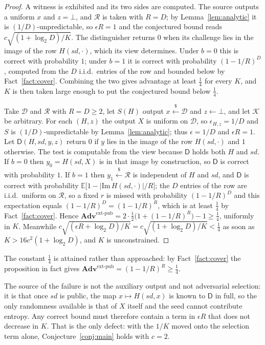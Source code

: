 \documentclass{conjura-solution}
\newcommand{\Adv}{\mathbf{Adv}}
\newcommand{\extp}{\mathrm{ext}\text{-}\mathrm{pub}}
\newcommand{\sd}{\mathit{sd}}
\renewcommand{\sample}{\stackrel{{\scriptscriptstyle\$}}{\leftarrow}}
\newcommand{\calK}{\mathcal{K}}
\newcommand{\calD}{\mathcal{D}}
\newcommand{\calR}{\mathcal{R}}
\begin{document}
\begin{proof}
A witness is exhibited and its two sides are computed. The source outputs a uniform $x$ and
$z = \bot$, and $\calR$ is taken with $R = D$; by Lemma~\ref{lem:analytic} it is
$(1/D)$-unpredictable, so $\epsilon R = 1$ and the conjectured bound reads
$c\sqrt{(1+\log_2 D)/K}$. The distinguisher returns $0$ when its challenge lies in the image of the
row $H(\sd,\cdot)$, which its view determines. Under $b = 0$ this is correct with probability $1$;
under $b = 1$ it is correct with probability $(1-1/R)^{D}$, computed from the $D$ i.i.d.\ entries
of the row and bounded below by Fact~\ref{fact:cover}. Combining the two gives advantage at least $\tfrac14$ for every $K$, and $K$ is then
taken large enough to put the conjectured bound below $\tfrac14$.

Take $\calD$ and $\calR$ with $R = D \ge 2$, let $S(H)$ output $x \sample \calD$ and
$z \leftarrow \bot$, and let $\calK$ be arbitrary. For each $(H,z)$ the output $X$ is uniform on
$\calD$, so $\epsilon_{H,z} = 1/D$ and $S$ is $(1/D)$-unpredictable by
Lemma~\ref{lem:analytic}; thus $\epsilon = 1/D$ and $\epsilon R = 1$. Let $\mathsf{D}(H,\sd,y,z)$
return $0$ if $y$ lies in the image of the row $H(\sd,\cdot)$ and $1$ otherwise. The test is
computable from the view because $\mathsf{D}$ holds both $H$ and $\sd$. If $b = 0$ then
$y_0 = H(\sd,X)$ is in that image by construction, so $\mathsf{D}$ is correct with probability $1$.
If $b = 1$ then $y_1 \sample \calR$ is independent of $H$ and $\sd$, and $\mathsf{D}$ is correct
with probability $\mathbb{E}\bigl[1 - |\mathrm{Im}\,H(\sd,\cdot)|/R\bigr]$; the $D$ entries of the
row are i.i.d.\ uniform on $\calR$, so a fixed $r$ is missed with probability $(1-1/R)^{D}$ and this
expectation equals $(1-1/R)^{D} = (1-1/R)^{R}$, which is at least $\tfrac14$ by
Fact~\ref{fact:cover}. Hence
$\Adv^{\extp} = 2 \cdot \tfrac12\bigl(1 + (1-1/R)^{R}\bigr) - 1 \ge \tfrac14$, uniformly in $K$.
Meanwhile $c\sqrt{(\epsilon R + \log_2 D)/K} = c\sqrt{(1+\log_2 D)/K} < \tfrac14$ as soon as
$K > 16c^{2}(1 + \log_2 D)$, and $K$ is unconstrained.
\end{proof}

The constant $\tfrac14$ is attained rather than approached: by Fact~\ref{fact:cover} the
proposition in fact gives
$\Adv^{\extp} = (1-1/R)^{R} \ge \tfrac14$.

The source of the failure is not the auxiliary output and not adversarial selection: it is that
once $\sd$ is public, the map $x \mapsto H(\sd,x)$ is known to $\mathsf{D}$ in full, so the only
randomness available is that of $X$ itself and the seed cannot contribute entropy. Any correct
bound must therefore contain a term in $\epsilon R$ that does not decrease in $K$. That is the
only defect: with the $1/K$ moved onto the selection term alone, Conjecture~\ref{conj:main} holds
with $c = 2$.
\end{document}
